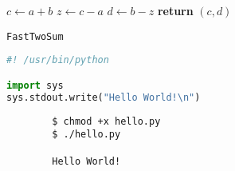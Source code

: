 \documentclass{article}
\begin{document}
\begin{center}
	\begin{minipage}{0.5\linewidth}
		\begin{algorithm}[H]
			\medskip
			$c \leftarrow a + b$ \;
			$z \leftarrow c - a$ \;
			$d \leftarrow b - z$ \;
			{\bf return} $(c,d)$ \;
			\caption{\texttt{FastTwoSum}} 
			\label{alg:fastTwoSum}  
		\end{algorithm}
	\end{minipage}
\end{center}

\begin{file}[hello.py]
\begin{lstlisting}[language=Python]
#! /usr/bin/python

import sys
sys.stdout.write("Hello World!\n")
\end{lstlisting}
\end{file}

\begin{commandline}
	\begin{verbatim}
		$ chmod +x hello.py
		$ ./hello.py

		Hello World!
	\end{verbatim}
\end{commandline}

\newpage


\end{document}

